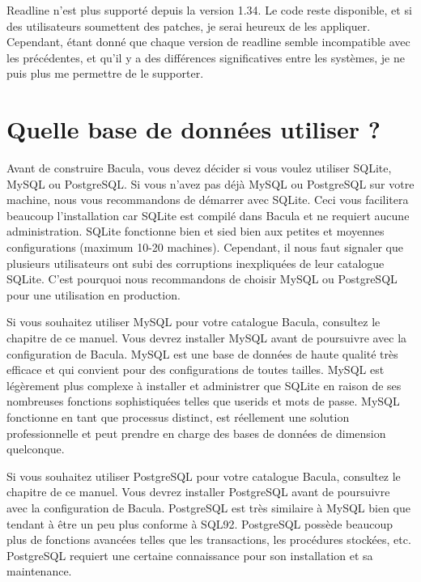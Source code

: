 {{{Readline n'est plus support\'e depuis la version 1.34. Le code reste
disponible, et si des utilisateurs soumettent des patches, je serai heureux de
les appliquer. Cependant, \'etant donn\'e que chaque version de readline
semble incompatible avec les pr\'ec\'edentes, et qu'il y a des diff\'erences
significatives entre les syst\`emes, je ne puis plus me permettre de le
supporter. 

\section{Quelle base de donn\'ees utiliser ?}
\label{DB}

Avant de construire Bacula, vous devez d\'ecider si vous voulez utiliser
SQLite, MySQL ou PostgreSQL. Si vous n'avez pas d\'ej\`a MySQL ou PostgreSQL
sur votre machine, nous vous recommandons de d\'emarrer avec SQLite. Ceci vous
facilitera beaucoup l'installation car SQLite est compil\'e dans Bacula et ne
requiert aucune administration. SQLite fonctionne bien et sied bien aux
petites et moyennes configurations (maximum 10-20 machines). Cependant, il nous 
faut signaler que plusieurs utilisateurs ont subi des corruptions inexpliqu\'ees 
de leur catalogue SQLite. C'est pourquoi nous recommandons de choisir MySQL 
ou PostgreSQL pour une utilisation en production.

Si vous souhaitez utiliser MySQL pour votre catalogue Bacula, consultez le
chapitre 
 de ce manuel.
Vous devrez installer MySQL avant de poursuivre avec la configuration de
Bacula. MySQL est une base de donn\'ees de haute qualit\'e tr\`es efficace et
qui convient pour des configurations de toutes tailles. MySQL est
l\'eg\`erement plus complexe \`a installer et administrer que SQLite en raison
de ses nombreuses fonctions sophistiqu\'ees telles que userids et mots de
passe. MySQL fonctionne en tant que processus distinct, est r\'eellement une
solution professionnelle et peut prendre en charge des bases de donn\'ees de
dimension quelconque. 

Si vous souhaitez utiliser PostgreSQL pour votre catalogue Bacula, consultez
le chapitre 
 de ce
manuel. Vous devrez installer PostgreSQL avant de poursuivre avec la
configuration de Bacula. PostgreSQL est tr\`es similaire \`a MySQL bien que
tendant \`a \^etre un peu plus conforme \`a SQL92. PostgreSQL poss\`ede
beaucoup plus de fonctions avanc\'ees telles que les transactions, les
proc\'edures stock\'ees, etc. PostgreSQL requiert une certaine connaissance
pour son installation et sa maintenance.

}}}
